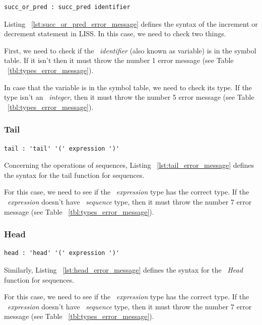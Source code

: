 \documentclass[
  oneside,
  11pt, a4paper,
  footinclude=true,
  headinclude=true,
  cleardoublepage=empty
]{scrbook}
\begin{document}
\begin{lstlisting}[caption={Succ\_or\_pred rule in LISS},label={lst:succ_or_pred_error_message}]
  succ_or_pred : succ_pred identifier
\end{lstlisting}

Listing ~\ref{lst:succ_or_pred_error_message} defines the syntax of the increment or decrement statement in LISS.
In this case, we need to check two things.

First, we need to check if the ~\textit{identifier} (also known as variable) is in the symbol table. If it isn't then it must throw the number 1 error message (see Table ~\ref{tbl:types_error_message}).

In case that the variable is in the symbol table, we need to check its type. If the type isn't an ~\textit{integer}, then it must throw the number 5 error message (see Table ~\ref{tbl:types_error_message}).

\subsubsection{Tail}

\begin{lstlisting}[caption={Tail rule in LISS},label={lst:tail_error_message}]
  tail : 'tail' '(' expression ')'
\end{lstlisting}

Concerning the operations of sequences, Listing ~\ref{lst:tail_error_message} defines the syntax for the tail function for sequences.

For this case, we need to see if the ~\textit{expression} type has the correct type.
If the ~\textit{expression} doesn't have ~\textit{sequence} type, then it must throw the number 7 error message (see Table ~\ref{tbl:types_error_message}).

\subsubsection{Head}

\begin{lstlisting}[caption={Head rule in LISS},label={lst:head_error_message}]
  head : 'head' '(' expression ')'
\end{lstlisting}

Similarly, Listing ~\ref{lst:head_error_message} defines the syntax for the ~\textit{Head} function for sequences.

For this case, we need to see if the ~\textit{expression} type has the correct type.
If the ~\textit{expression} doesn't have ~\textit{sequence} type, then it must throw the number 7 error message (see Table ~\ref{tbl:types_error_message}).
\end{document}

